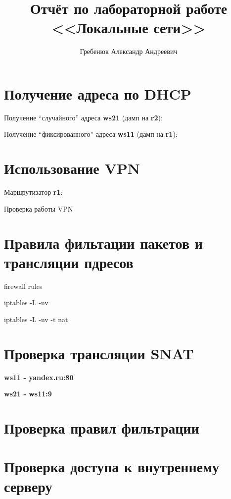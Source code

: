 \documentclass[a4paper,12pt]{article}
\title{Отчёт по лабораторной работе \\ <<Локальные сети>>}
\author{Гребенюк Александр Андреевич}
\begin{document}
\maketitle

\tableofcontents


\clearpage
\section{Получение адреса по DHCP}

Получение ``случайного'' адреса \textbf{ws21} (дамп на \textbf{r2}):

Получение ``фиксированного'' адреса \textbf{ws11} (дамп на \textbf{r1}):


\clearpage
\section{Использование VPN}

Маршрутизатор \textbf{r1}:



Проверка работы VPN



\clearpage
\section{Правила фильтации пакетов и трансляции пдресов}

firewall rules

iptables -L -nv

iptables -L -nv -t nat


\clearpage
\section{Проверка трансляции SNAT}

\textbf{ws11 - yandex.ru:80}

\textbf{ws21 - ws11:9}


\clearpage
\section{Проверка правил фильтрации}


\clearpage
\section{Проверка доступа к внутреннему серверу}
\end{document}
